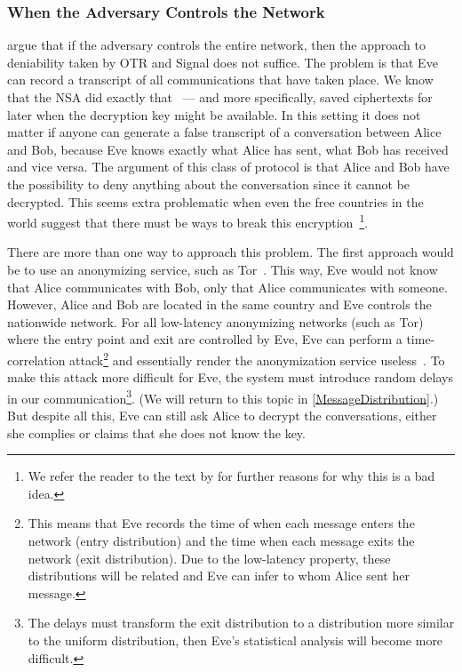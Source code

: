 \subsubsection{When the Adversary Controls the Network}
\label{WhenAdversaryControlsNetwork}

\textcite{OTPKX} argue that if the adversary controls the entire network, then 
the approach to deniability taken by \ac{OTR} and Signal does not suffice.
The problem is that Eve can record a transcript of all communications
that have taken place.
We know that the \ac{NSA} did exactly that~\cite{XKeyscore} --- and more 
specifically, saved ciphertexts for later when the decryption key might be 
available.
In this setting it does not matter if anyone can generate a false transcript of 
a conversation between Alice and Bob, because Eve knows exactly what Alice has 
sent, what Bob has received and vice versa.
The argument of this class of protocol is that Alice and Bob have the 
possibility to deny anything about the conversation since it cannot be 
decrypted.
This seems extra problematic when even the free countries in the world suggest 
that there must be ways to break this 
encryption~\cite{BackDoorEncryption}\footnote{%
  We refer the reader to the text by \textcite{KeysUnderDoormats} for further 
  reasons for why this is a bad idea.
}.

There are more than one way to approach this problem.
The first approach would be to use an anonymizing service, such as 
Tor~\cite{Tor}.
This way, Eve would not know that Alice communicates with Bob, only that
Alice communicates with someone.
However, Alice and Bob are located in the same country and Eve controls the 
nationwide network.
For all low-latency anonymizing networks (such as Tor) where the entry point 
and exit are controlled by Eve, Eve can perform a time-correlation 
attack\footnote{%
  This means that Eve records the time of when each message enters the network 
  (entry distribution) and the time when each message exits the network (exit 
  distribution).
  Due to the low-latency property, these distributions will be related and Eve 
  can infer to whom Alice sent her message.
} and essentially render the anonymization service 
useless~\cite{SystemsForAnonymousCommunication}.
To make this attack more difficult for Eve, the system must introduce random 
delays in our communication\footnote{%
  The delays must transform the exit distribution to a distribution more 
  similar to the uniform distribution, then Eve's statistical analysis will 
  become more difficult.
}.
(We will return to this topic in \cref{MessageDistribution}.)
But despite all this, Eve can still ask Alice to decrypt the conversations, 
either she complies or claims that she does not know the key.

